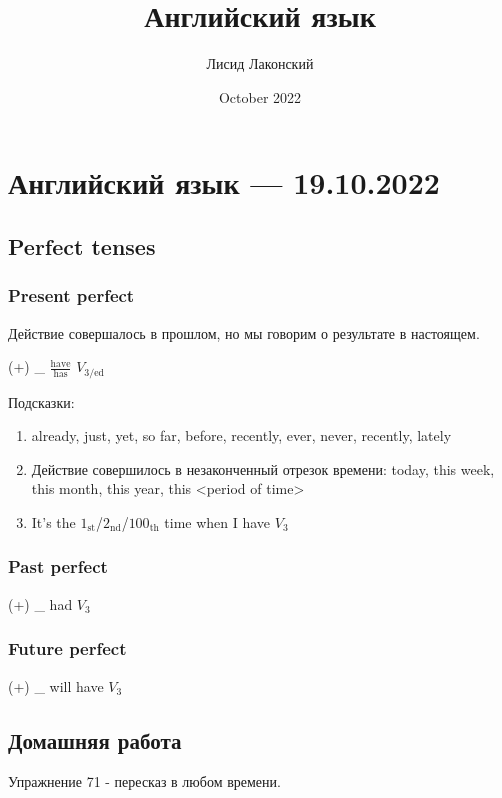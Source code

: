 \documentclass{article}
\title{Английский язык}
\author{Лисид Лаконский}
\date{October 2022}
\begin{document}
\maketitle
\tableofcontents
\pagebreak

\section{Английский язык — 19.10.2022}

\subsection{Perfect tenses}

\subsubsection{Present perfect}

\begin{flushleft}

Действие совершалось в прошлом, но мы говорим о результате в настоящем.

\hfill

(+) \_ $\frac{\text{have}}{\text{has}}$ $V_{3/\text{ed}}$

\hfill

Подсказки:

\begin{enumerate}
    \item already, just, yet, so far, before, recently, ever, never, recently, lately
    \item Действие совершилось в незаконченный отрезок времени: today, this week, this month, this year, this <period of time>
    \item It's the $1_{\text{st}}$/$2_{\text{nd}}$/$100_{\text{th}}$ time when I have $V_3$
\end{enumerate}

\subsubsection{Past perfect}

(+) \_ had $V_3$

\subsubsection{Future perfect}

(+) \_ will have $V_3$

\pagebreak
\subsection{Домашняя работа}

Упражнение 71 - пересказ в любом времени.

\end{flushleft}
\end{document}
